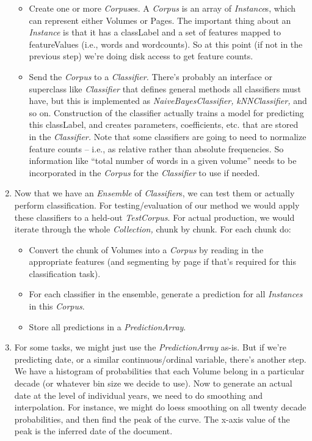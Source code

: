 \documentclass[12pt]{article}
\begin{document}
\begin{enumerate}
\begin{itemize}
\item Create one or more \emph{Corpus}es. A \emph{Corpus} is an array of \emph{Instance}s, which can represent either Volumes or Pages. The important thing about an \emph{Instance} is that it has a classLabel and a set of features mapped to featureValues (i.e., words and wordcounts). So at this point (if not in the previous step) we're doing disk access to get feature counts.
\item Send the \emph{Corpus} to a \emph{Classifier.} There's probably an interface or superclass like \emph{Classifier} that defines general methods all classifiers must have, but this is implemented as \emph{NaiveBayesClassifier,} \emph{kNNClassifier,} and so on. Construction of the classifier actually trains a model for predicting this classLabel, and creates parameters, coefficients, etc. that are stored in the \emph{Classifier.} Note that some classifiers are going to need to normalize feature counts -- i.e., as relative rather than absolute frequencies. So information like ``total number of words in a given volume'' needs to be incorporated in the \emph{Corpus} for the \emph{Classifier} to use if needed.
\end{itemize}
\item Now that we have an \emph{Ensemble} of \emph{Classifier}s, we can test them or actually perform classification. For testing/evaluation of our method we would apply these classifiers to a held-out \emph{TestCorpus}. For actual production, we would iterate through the whole \emph{Collection,} chunk by chunk. For each chunk do:
\begin{itemize}
\item Convert the chunk of Volumes into a \emph{Corpus} by reading in the appropriate features (and segmenting by page if that's required for this classification task).
\item For each classifier in the ensemble, generate a prediction for all \emph{Instances} in this \emph{Corpus}.
\item Store all predictions in a \emph{PredictionArray}.
\end{itemize}
\item For some tasks, we might just use the \emph{PredictionArray} as-is. But if we're predicting date, or a similar continuous/ordinal variable, there's another step. We have a histogram of probabilities that each Volume belong in a particular decade (or whatever bin size we decide to use). Now to generate an actual date at the level of individual years, we need to do smoothing and interpolation. For instance, we might do loess smoothing on all twenty decade probabilities, and then find the peak of the curve. The x-axis value of the peak is the inferred date of the document.

\end{enumerate}
\end{document}

